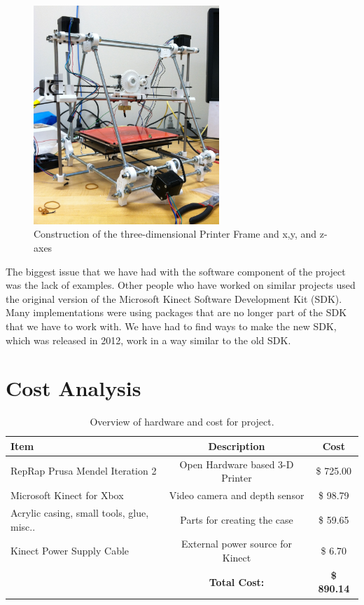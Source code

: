 \documentclass[pdftex,10.5pt]{report}
\begin{document}
\begin{figure}[H]
	\centering
	\includegraphics[width=70mm]{figures/photo.JPG}
	\caption{Construction of the three-dimensional Printer Frame and x,y, and z-axes}
	\label{basebuilt}
\end{figure}

The biggest issue that we have had with the software component of the project was the lack of examples. Other people who have worked on similar projects used the original version of the Microsoft Kinect Software Development Kit (SDK). Many implementations were using packages that are no longer part of the SDK that we have to work with. We have had to find ways to make the new SDK, which was released in 2012, work in a way similar to the old SDK. 

\section{Cost Analysis}

\begin{table}[h]
	\centering
 	\begin{tabular}{|l|c|c|}
		\hline
		\textbf{Item} & \textbf{Description} & \textbf{Cost} \\
		\hline
 		RepRap Prusa Mendel Iteration 2 & Open Hardware based 3-D Printer& \$ 725.00\\
		Microsoft Kinect for Xbox & Video camera and depth sensor & \$ 98.79 \\
		Acrylic casing, small tools, glue, misc.. & Parts for creating the case & \$ 59.65 \\
		Kinect Power Supply Cable & External power source for Kinect & \$ 6.70 \\
		\hline
		& \textbf{Total Cost:} & \textbf{\$  890.14} \\
		\hline
	\end{tabular}
	\caption{
	Overview of hardware and cost for project.
	}	
\label{tab:costs}
\end{table}
\end{document}
